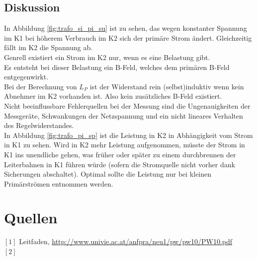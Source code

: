 \documentclass[12pt,a4paper]{article}
\begin{document}
\begin{multicols}{2}

\subsection{Diskussion}

In Abbildung \ref{fig:trafo_si_pi_su} ist zu sehen, das wegen konstanter Spannung im K1 bei höherem Verbrauch im K2 sich der primäre Strom ändert. Gleichzeitig fällt im K2 die Spannung ab.\\
Genrell existiert ein Strom im K2 nur, wenn es eine Belastung gibt.\\
Es entsteht bei dieser Belastung ein B-Feld, welches dem primären B-Feld entgegenwirkt.\\
Bei der Berechnung von $L_P$ ist der Widerstand rein (selbst)induktiv wenn kein Abnehmer im K2 vorhanden ist. Also kein zusätzliches B-Feld existiert.\\
Nicht beeinflussbare Fehlerquellen bei der Messung sind die Ungenauigkeiten der Messgeräte, Schwankungen der Netzspannung und ein nicht lineares Verhalten des Regelwiderstandes. \\
In Abbildung \ref{fig:trafo_pi_sp} ist die Leistung in K2 in Abhängigkeit vom Strom in K1 zu sehen. Wird in K2 mehr Leistung aufgenommen, müsste der Strom in K1  ins unendliche gehen, was früher oder später zu einem durchbrennen der Leiterbahnen in K1 führen würde (sofern die Stromquelle nicht vorher dank Sicherungen abschaltet). Optimal sollte die Leistung nur bei kleinen Primärströmen entnommen werden.\\





\section{Quellen}
$[1]$ Leitfaden, \url{http://www.univie.ac.at/anfpra/neu1/pw/pw10/PW10.pdf}\\
$[2]$ 
\end{multicols}
\end{document}

